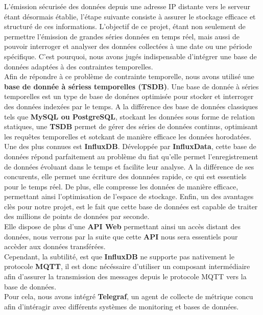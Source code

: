 \documentclass[10pt, a4paper]{report}
\begin{document}
	L'émission sécurisée des données depuis une adresse IP distante vers le serveur étant désormais établie, l'étape suivante consiste à assurer le stockage efficace et structuré de ces informations. L'objectif de ce projet, étant non seulement de permettre l'émission de grandes séries données en temps réel, mais aussi de pouvoir interroger et analyser des données collectées à une date ou une période spécifique. C'est pourquoi, nous avons jugés indispensable d'intégrer une base de données adaptées à des contraintes temporelles.\\
	Afin de répondre à ce problème de contrainte temporelle, nous avons utilisé une \textbf{base de donnée à sériess temporelles (TSDB)}. Une base de donnée à séries temporelles est un type de base de donénes optimisée pour stocker et interroger des données indexées par le temps. A la différence des base de données classiques tels que \textbf{MySQL ou PostgreSQL}, stockant les données sous forme de relation statiques, une \textbf{TSDB} permet de gérer des séries de données continus, optimisant les requêtes temporelles et sotckant de manière efficace les données horodatées.\\
	Une des plus connues est \textbf{InfluxDB}. Développée par \textbf{InfluxData}, cette base de données répond parfaitement au problème du fiat qu'elle permet l'enregistrement de données évoluant dans le temps et facilite leur analyse. A la différence de ses concurents, elle permet une écriture des donnnées rapide, ce qui est essentiels pour le temps réel. De plus, elle compresse les données de manière efficace, permettant ainsi l'optimisation de l'espace de stockage. Enfin, un des avantages clès pour notre projet, est le fait que cette base de données est capable de traiter des millions de points de données par seconde.\\
	Elle dispose de plus d'une \textbf{API Web} permettant ainsi un accès distant des données, nous verrons par la suite que cette \textbf{API} nous sera essentiels pour accèder aux données transférées.\\
	Cependant, la subtilité, est que \textbf{InfluxDB} ne supporte pas nativement le protocole \textbf{MQTT}, il est donc nécéssaire d'utiliser un composant intermédiaire afin d'assurer la transmission des messages depuis le protocole MQTT vers la base de données.\\
	Pour cela, nous avons intégré \textbf{Telegraf}, un agent de collecte de métrique concu afin d'intéragir avec différents systèmes de monitoring et bases de données.\\
\end{document}
